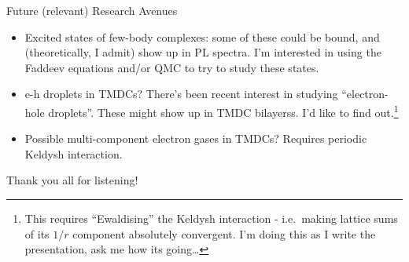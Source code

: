 \documentclass[12pt, pdf, hyperref={draft}, usenames, dvipsnames]{beamer}
\begin{document}

\begin{frame}{Future (relevant) Research Avenues}

\begin{itemize}

  \item Excited states of few-body complexes: some of these could
  be bound, and (theoretically, I admit) show up in PL spectra. I'm interested in
  using the Faddeev equations and/or QMC to try to study these
  states.

  \item e-h droplets in TMDCs? There's been recent interest in
  studying ``electron-hole droplets''. These might show up in
  TMDC bilayerss. I'd like to find out.\footnote{This requires ``Ewaldising''
  the Keldysh interaction - i.e.\ making lattice sums of its $1/r$ component
  absolutely convergent. I'm doing this as I write the presentation, ask me how
  its going\ldots}

  \item Possible multi-component electron gases in TMDCs? Requires periodic
  Keldysh interaction.

\end{itemize}
\end{frame}

\begin{frame}[plain]
\begin{center}
  {\Huge Thank you all for listening!}
\end{center}
\end{frame}
\end{document}
